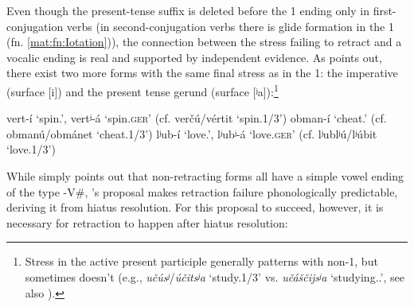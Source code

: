 \documentclass[output=paper,colorlinks,citecolor=black,koreanfont]{langscibook}
\begin{document}
Even though the present-tense suffix is deleted before the {1\SG} ending only in first-conjugation verbs (in second-conjugation verbs there is glide formation in the {1\SG} (fn. \ref{mat:fn:Iotation})), the connection between the stress failing to retract and a vocalic ending is real and supported by independent evidence. As \citet{Feldstein2015} points out, there exist two more forms with the same final stress as in the {1\SG}: the imperative (surface [i]) and the present tense gerund (surface [ʲa]):\footnote{Stress in the active present participle generally patterns with non-{1\SG}, but sometimes doesn’t (e.g., \textit{učúsʲ}/\textit{účitsʲa} ‘study.{1\SG}/{3\SG}’ vs. \textit{učáščijsʲa} ‘studying.{\MASC.\SG}’, see also \citealt[29, 77]{Zaliznjak1985}).}

\ea
\ea vert-í ‘spin.{\IMP}’, vertʲ-á ‘spin.\textsc{ger}’ (cf. verčú/vértit ‘spin.{1\SG}/{3\SG}’) 
\ex obman-í ‘cheat.{\IMP}’ (cf. obmanú/obmánet ‘cheat.{1\SG}/{3\SG}’)
\ex lʲub-í ‘love.{\IMP}’, lʲubʲ-á ‘love.\textsc{ger}’ (cf. lʲublʲú/lʲúbit ‘love.{1\SG}/{3\SG}’)
\z
\z

\noindent While \citeauthor{Feldstein2015} simply points out that non-retracting forms all have a simple vowel ending of the type -V\#, \citeauthor{Idsardi1992}’s proposal makes retraction failure phonologically predictable, deriving it from hiatus resolution. For this proposal to succeed, however, it is necessary for retraction to happen after hiatus resolution:\bigskip
\end{document}
